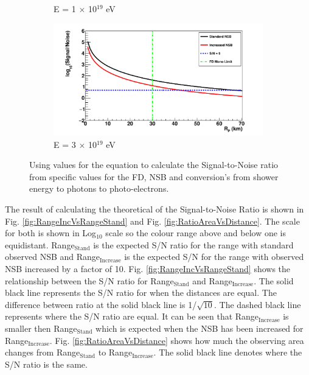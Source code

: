 \begin{figure}
\begin{subfigure}[b]{0.48\textwidth}
\caption{E = 1 $\times$ 10$^{19}$ eV}
\end{subfigure}
\hspace{3mm}
\begin{subfigure}[b]{0.48\textwidth}
\includegraphics[width=\textwidth]{chapters/graphs/SelectionEff/SignalToNoiseVsDistance_E3e19eV.pdf}
\caption{E = 3 $\times$ 10$^{19}$ eV}
\end{subfigure}
\caption{Using values for the equation to calculate the Signal-to-Noise ratio from specific values for the FD, NSB and conversion's from shower energy to photons to photo-electrons. } \label{fig:SNvsDistance}
\end{figure}

The result of calculating the theoretical of the Signal-to-Noise Ratio is shown in Fig. \ref{fig:RangeIncVsRangeStand} and Fig. \ref{fig:RatioAreaVsDistance}. The scale for both is shown in Log$_{10}$ scale so the colour range above and below one is equidistant.  Range$_{\mathrm{Stand}}$ is the expected S/N ratio for the range with standard observed NSB and Range$_{\mathrm{Increase}}$ is the expected S/N for the range with observed NSB increased by a factor of 10. Fig. \ref{fig:RangeIncVsRangeStand} shows the relationship between the S/N ratio for Range$_{\mathrm{Stand}}$ and Range$_{\mathrm{Increase}}$. The solid black line represents the S/N ratio for when the distances are equal. The difference between ratio at the solid black line is 1/$\sqrt{10}$. The dashed black line represents where the S/N ratio are equal. It can be seen that Range$_{\mathrm{Increase}}$ is smaller then Range$_{\mathrm{Stand}}$ which is expected when the NSB has been increased for Range$_{\mathrm{Increase}}$. Fig. \ref{fig:RatioAreaVsDistance} shows how much the observing area changes from Range$_{\mathrm{Stand}}$ to Range$_{\mathrm{Increase}}$. The solid black line denotes where the S/N ratio is the same.

